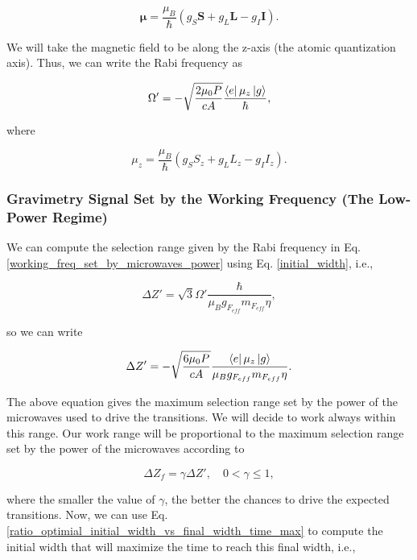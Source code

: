 \documentclass{article}
\begin{document}
\begin{equation}
     \boldsymbol{\mu} = \frac{\mu_{B}}{\hbar}(g_{S}\boldsymbol{S} + g_{L}\boldsymbol{L} - g_{I}\boldsymbol{I}).
\end{equation}

We will take the magnetic field to be along the z-axis (the atomic quantization axis). Thus, we can write the Rabi frequency as

\begin{equation}\label{working_freq_set_by_microwaves_power}
\Omega' = - \sqrt{\frac{2 \mu_{0} P}{c A}} \frac{\bra{e} \mu_{z} \ket{g}}{\hbar},
\end{equation}

where 

\begin{equation}
     \mu_{z} = \frac{\mu_{B}}{\hbar}(g_{S}S_{z} + g_{L}L_{z} - g_{I}I_{z}).
\end{equation}

\subsubsection{Gravimetry Signal Set by the Working Frequency (The Low-Power Regime)}
We can compute the selection range given by the Rabi frequency in Eq. \ref{working_freq_set_by_microwaves_power} using Eq. \ref{initial_width}, i.e.,

\begin{equation*}
\Delta Z' = \sqrt{3} \Omega' \frac{\hbar}{\mu_{B} g_{F_{eff}} m_{F_{eff}} \eta},
\end{equation*}

so we can write

\begin{equation}\label{maximum_selection_range}
\Delta Z' = - \sqrt{\frac{6 \mu_{0} P}{c A}} \frac{\bra{e} \mu_{z} \ket{g}}{\mu_{B} g_{F_{eff}} m_{F_{eff}} \eta}.
\end{equation}

The above equation gives the maximum selection range set by the power of the microwaves used to drive the transitions. We will decide to work always within this range. Our work range will be proportional to the maximum selection range set by the power of the microwaves according to

\begin{equation}
    \Delta Z_{f} = \gamma \Delta Z' \mathrm{,} \quad 0 < \gamma \leq 1,
\end{equation}

where the smaller the value of $\gamma$, the better the chances to drive the expected transitions. Now, we can use Eq. \ref{ratio_optimial_initial_width_vs_final_width_time_max} to compute the initial width that will maximize the time to reach this final width, i.e.,
\end{document}
